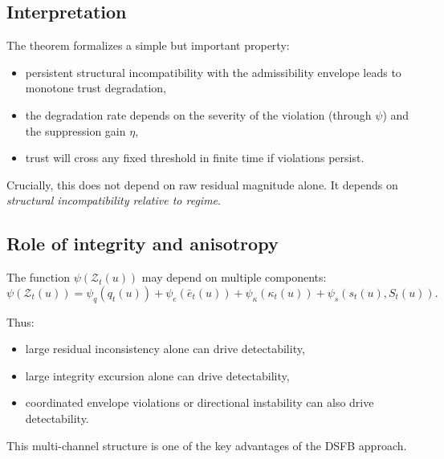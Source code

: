 \documentclass[11pt,letterpaper]{article}
\theoremstyle{gcresult}
\theoremstyle{definition}
\begin{document}

\subsection{Interpretation}

The theorem formalizes a simple but important property:

\begin{itemize}[leftmargin=1.5em]
    \item persistent structural incompatibility with the admissibility envelope leads to monotone trust degradation,
    \item the degradation rate depends on the severity of the violation (through $\psi$) and the suppression gain $\eta$,
    \item trust will cross any fixed threshold in finite time if violations persist.
\end{itemize}

Crucially, this does not depend on raw residual magnitude alone. It depends on \emph{structural incompatibility relative to regime}.


\subsection{Role of integrity and anisotropy}

The function $\psi(\mathcal{Z}_t(u))$ may depend on multiple components:
\begin{equation}
\psi(\mathcal{Z}_t(u))=
\psi_q(q_t(u))
+
\psi_e(\bar e_t(u))
+
\psi_\kappa(\kappa_t(u))
+
\psi_s(s_t(u),S_t(u)).
\end{equation}

Thus:
\begin{itemize}[leftmargin=1.5em]
    \item large residual inconsistency alone can drive detectability,
    \item large integrity excursion alone can drive detectability,
    \item coordinated envelope violations or directional instability can also drive detectability.
\end{itemize}

This multi-channel structure is one of the key advantages of the DSFB approach.
\end{document}
